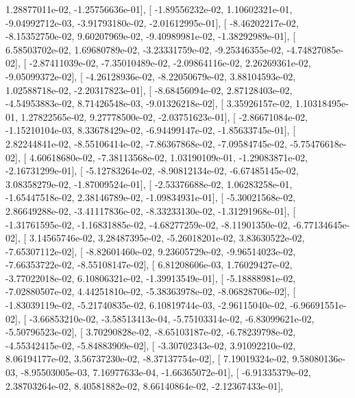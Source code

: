 \documentclass{article}
\begin{document}
          1.28877011e-02,  -1.25756636e-01],
       [ -1.89556232e-02,   1.10602321e-01,  -9.04992712e-03,
         -3.91793180e-02,  -2.01612995e-01],
       [ -8.46202217e-02,  -8.15352750e-02,   9.60207969e-02,
         -9.40989981e-02,  -1.38292989e-01],
       [  6.58503702e-02,   1.69680789e-02,  -3.23331759e-02,
         -9.25346355e-02,  -4.74827085e-02],
       [ -2.87411039e-02,  -7.35010489e-02,  -2.09864116e-02,
          2.26269361e-02,  -9.05099372e-02],
       [ -4.26128936e-02,  -8.22050679e-02,   3.88104593e-02,
          1.02588718e-02,  -2.20317823e-01],
       [ -8.68456094e-02,   2.87128403e-02,  -4.54953883e-02,
          8.71426548e-03,  -9.01326218e-02],
       [  3.35926157e-02,   1.10318495e-01,   1.27822565e-02,
          9.27778500e-02,  -2.03751623e-01],
       [ -2.86671084e-02,  -1.15210104e-03,   8.33678429e-02,
         -6.94499147e-02,  -1.85633745e-01],
       [  2.82244841e-02,  -8.55106414e-02,  -7.86367868e-02,
         -7.09584745e-02,  -5.75476618e-02],
       [  4.60618680e-02,  -7.38113568e-02,   1.03190109e-01,
         -1.29083871e-02,  -2.16731299e-01],
       [ -5.12783264e-02,  -8.90812134e-02,  -6.67485145e-02,
          3.08358279e-02,  -1.87009524e-01],
       [ -2.53376688e-02,   1.06283258e-01,  -1.65447518e-02,
          2.38146789e-02,  -1.09834931e-01],
       [ -5.30021568e-02,   2.86649288e-02,  -3.41117836e-02,
         -8.33233130e-02,  -1.31291968e-01],
       [ -1.31761595e-02,  -1.16831885e-02,  -4.68277259e-02,
         -8.11901350e-02,  -6.77134645e-02],
       [  3.14565746e-02,   3.28487395e-02,  -5.26018201e-02,
          3.83630522e-02,  -7.65307112e-02],
       [ -8.82601460e-02,   9.23605729e-02,  -9.96514023e-02,
         -7.66353722e-02,  -8.55108147e-02],
       [  6.81208606e-03,   1.76029427e-02,  -3.77022018e-02,
          6.10806321e-02,  -1.39913549e-01],
       [ -5.18888981e-02,  -7.02880507e-02,   4.44251810e-02,
         -5.38363978e-02,  -8.06828706e-02],
       [ -1.83039119e-02,  -5.21740835e-02,   6.10819744e-03,
         -2.96115040e-02,  -6.96691551e-02],
       [ -3.66853210e-02,  -3.58513413e-04,  -5.75103314e-02,
         -6.83099621e-02,  -5.50796523e-02],
       [  3.70290828e-02,  -8.65103187e-02,  -6.78239798e-02,
         -4.55342415e-02,  -5.84883909e-02],
       [ -3.30702343e-02,   3.91092210e-02,   8.06194177e-02,
          3.56737230e-02,  -8.37137754e-02],
       [  7.19019324e-02,   9.58080136e-03,  -8.95503005e-03,
          7.16977633e-04,  -1.66365072e-01],
       [ -6.91335379e-02,   2.38703264e-02,   8.40581882e-02,
          8.66140864e-02,  -2.12367433e-01],
\end{document}
